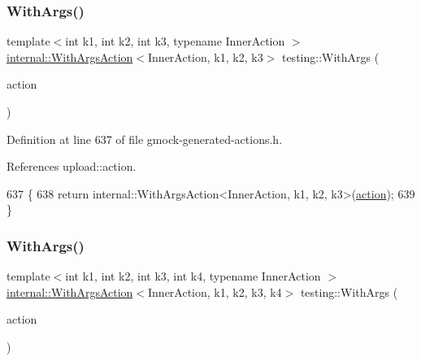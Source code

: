 \subsubsection{\texorpdfstring{With\+Args()}{WithArgs()}\hspace{0.1cm}{\footnotesize\ttfamily [3/10]}}
{\footnotesize\ttfamily template$<$int k1, int k2, int k3, typename Inner\+Action $>$ \\
\hyperlink{classtesting_1_1internal_1_1WithArgsAction}{internal\+::\+With\+Args\+Action}$<$Inner\+Action, k1, k2, k3$>$ testing\+::\+With\+Args (\begin{DoxyParamCaption}\item[{const Inner\+Action \&}]{action }\end{DoxyParamCaption})\hspace{0.3cm}{\ttfamily [inline]}}



Definition at line 637 of file gmock-\/generated-\/actions.\+h.



References upload\+::action.


\begin{DoxyCode}
637                                     \{
638   \textcolor{keywordflow}{return} internal::WithArgsAction<InnerAction, k1, k2, k3>(\hyperlink{namespaceupload_a675d13c979f1c720866d22ed1736f580}{action});
639 \}
\end{DoxyCode}
\mbox{\label{namespacetesting_a646a2e4ac7866ee8c486cb167ba9b45e}} 
\subsubsection{\texorpdfstring{With\+Args()}{WithArgs()}\hspace{0.1cm}{\footnotesize\ttfamily [4/10]}}
{\footnotesize\ttfamily template$<$int k1, int k2, int k3, int k4, typename Inner\+Action $>$ \\
\hyperlink{classtesting_1_1internal_1_1WithArgsAction}{internal\+::\+With\+Args\+Action}$<$Inner\+Action, k1, k2, k3, k4$>$ testing\+::\+With\+Args (\begin{DoxyParamCaption}\item[{const Inner\+Action \&}]{action }\end{DoxyParamCaption})\hspace{0.3cm}{\ttfamily [inline]}}



